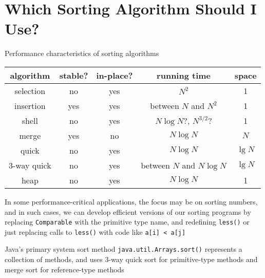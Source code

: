 \documentclass[8pt,a4paper,compress]{beamer}
\begin{document}
\section{Which Sorting Algorithm Should I Use?}
\begin{frame}[fragile]
\pause

Performance characteristics of sorting algorithms
\begin{center}
\begin{tabular}{ccccc}
algorithm & stable? & in-place? & running time & space \\ \hline
selection & no & yes & $N^2$ & 1 \\
insertion & yes & yes & between $N$ and $N^2$ & 1 \\
shell & no & yes & $N\log N$?, $N^{3/2}$? & 1 \\
merge & yes & no & $N\log N$ & $N$ \\
quick & no & yes & $N\log N$ & $\lg N$ \\
3-way quick & no & yes & between $N$ and $N\log N$ & $\lg N$ \\
heap & no & yes & $N\log N$ & 1
\end{tabular} 
\end{center}

\pause
\bigskip

In some performance-critical applications, the focus may be on sorting numbers, and in such cases, we can develop efficient versions of our sorting programs by replacing \lstinline$Comparable$ with the primitive type name, and redefining \lstinline$less()$ or just replacing calls to \lstinline$less()$ with code like \lstinline$a[i] < a[j]$

\pause
\bigskip

Java's primary system sort method  \lstinline$java.util.Arrays.sort()$ represents a collection of methods, and uses 3-way quick sort for primitive-type methods and merge sort for reference-type methods
\end{frame}
\end{document}
